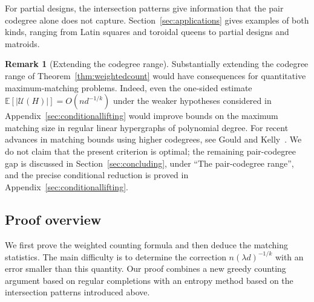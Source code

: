 \documentclass[11pt,reqno]{amsart}
\numberwithin{equation}{section}
\theoremstyle{plain}
\theoremstyle{definition}
\newtheorem{remark}[theorem]{Remark}
\newcommand{\E}{\mathbb E}
\newcommand{\calU}{\mathcal U}
\begin{document}
For partial designs, the intersection patterns give information that the pair codegree alone does not capture.
Section~\ref{sec:applications} gives examples of both kinds, ranging from Latin squares and toroidal queens to partial designs and matroids.

\begin{remark}[Extending the codegree range]\label{rem:codegree-extension}
    Substantially extending the codegree range of Theorem~\ref{thm:weightedcount} would have consequences for quantitative maximum-matching problems.
    Indeed, even the one-sided estimate $\E[|\calU(H)|]=O(nd^{-1/k})$ under the weaker hypotheses considered in Appendix~\ref{sec:conditionallifting} would improve bounds on the maximum matching size in regular linear hypergraphs of polynomial degree.
    For recent advances in matching bounds using higher codegrees, see Gould and Kelly~\cite{GK}.
    We do not claim that the present criterion is optimal; the remaining pair-codegree gap is discussed in Section~\ref{sec:concluding}, under ``The pair-codegree range'', and the precise conditional reduction is proved in Appendix~\ref{sec:conditionallifting}.
\end{remark}


\subsection{Proof overview}\label{subsec:overview}

We first prove the weighted counting formula and then deduce the matching statistics.
The main difficulty is to determine the correction $n(\lambda d)^{-1/k}$ with an error smaller than this quantity.
Our proof combines a new greedy counting argument based on regular completions with an entropy method based on the intersection patterns introduced above.
\end{document}
